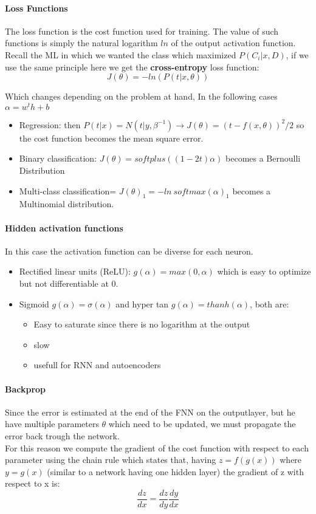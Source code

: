 \paragraph{Loss Functions}
The loss function is the cost function used for training. The value of such functions is simply the natural logarithm $ln$  of the output activation function.\\
Recall the ML in which we wanted the class which maximized $P(C_i|x,D)$, if we use the same principle here we get the \textbf{cross-entropy} loss function:
$$J(\theta)=-ln(P(t|x,\theta))$$

Which changes depending on the problem at hand,   In the following cases $\alpha=w^th+b$
\begin{itemize}
\item Regression: then $P(t|x)=N(t|y,\beta^{-1})\to J(\theta)=(t-f(x,\theta))^2/2$ so the cost function becomes the mean square error.
\item Binary classification: $J(\theta)=softplus((1-2t)\alpha)$ becomes a Bernoulli Distribution
\item Multi-class classification= $J(\theta)_1=-ln\ softmax(\alpha)_1$ becomes a Multinomial distribution.
\end{itemize}

\paragraph{Hidden activation functions}
In this case the activation function can be diverse for each neuron.
\begin{itemize}
\item Rectified linear units (ReLU): $g(\alpha)=max(0,\alpha)$ which is easy to optimize but not differentiable at 0.
\item Sigmoid $g(\alpha)=\sigma(\alpha)$ and hyper tan $g(\alpha)=thanh(\alpha)$, both are:
	\begin{itemize}
	\item Easy to saturate since there is no logarithm at the output
	\item slow
	\item usefull for RNN and autoencoders
	\end{itemize}
\end{itemize}

\paragraph{Backprop}
Since the error is estimated at the end of the FNN on the outputlayer, but he have multiple parameters $\theta$ which need to be updated, we must propagate the error back trough the network.\\
For this reason we compute the gradient of the cost function with respect to each parameter using the chain rule which states that, having $z=f(g(x))$ where $y=g(x)$ (similar to a network having one hidden layer) the gradient of z with respect to x is:
$$\frac{dz}{dx}=\frac{dz}{dy}\frac{dy}{dx}$$

